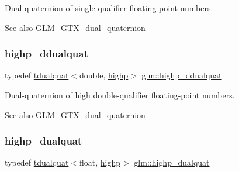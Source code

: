 Dual-\/quaternion of single-\/qualifier floating-\/point numbers.

\begin{DoxySeeAlso}{See also}
\mbox{\hyperlink{group__gtx__dual__quaternion}{G\+L\+M\+\_\+\+G\+T\+X\+\_\+dual\+\_\+quaternion}} 
\end{DoxySeeAlso}
\mbox{\label{group__gtx__dual__quaternion_ga83e4c5d27c8b0a264a3f3aed24f3f84e}} 
\subsubsection{\texorpdfstring{highp\+\_\+ddualquat}{highp\_ddualquat}}
{\footnotesize\ttfamily typedef \mbox{\hyperlink{structglm_1_1tdualquat}{tdualquat}}$<$double, \mbox{\hyperlink{namespaceglm_a36ed105b07c7746804d7fdc7cc90ff25ac6f7eab42eacbb10d59a58e95e362074}{highp}}$>$ \mbox{\hyperlink{group__gtx__dual__quaternion_ga83e4c5d27c8b0a264a3f3aed24f3f84e}{glm\+::highp\+\_\+ddualquat}}}

Dual-\/quaternion of high double-\/qualifier floating-\/point numbers.

\begin{DoxySeeAlso}{See also}
\mbox{\hyperlink{group__gtx__dual__quaternion}{G\+L\+M\+\_\+\+G\+T\+X\+\_\+dual\+\_\+quaternion}} 
\end{DoxySeeAlso}
\mbox{\label{group__gtx__dual__quaternion_ga98557c3577757f2ced8f35b1de7fa234}} 
\subsubsection{\texorpdfstring{highp\+\_\+dualquat}{highp\_dualquat}}
{\footnotesize\ttfamily typedef \mbox{\hyperlink{structglm_1_1tdualquat}{tdualquat}}$<$float, \mbox{\hyperlink{namespaceglm_a36ed105b07c7746804d7fdc7cc90ff25ac6f7eab42eacbb10d59a58e95e362074}{highp}}$>$ \mbox{\hyperlink{group__gtx__dual__quaternion_ga98557c3577757f2ced8f35b1de7fa234}{glm\+::highp\+\_\+dualquat}}}

